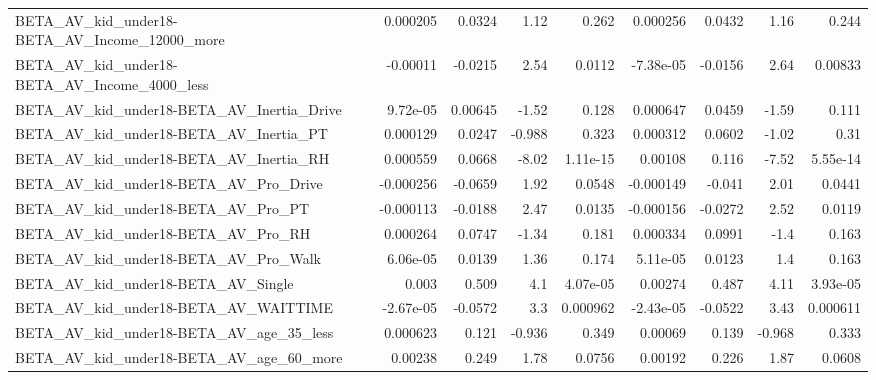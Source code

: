\begin{tabular}{lrrrrrrrr}
BETA\_AV\_kid\_under18-BETA\_AV\_Income\_12000\_more      &    0.000205 &       0.0324 &     1.12 &    0.262 &   0.000256 &      0.0432 &         1.16 &         0.244 \\
BETA\_AV\_kid\_under18-BETA\_AV\_Income\_4000\_less       &    -0.00011 &      -0.0215 &     2.54 &   0.0112 &  -7.38e-05 &     -0.0156 &         2.64 &       0.00833 \\
BETA\_AV\_kid\_under18-BETA\_AV\_Inertia\_Drive          &    9.72e-05 &      0.00645 &    -1.52 &    0.128 &   0.000647 &      0.0459 &        -1.59 &         0.111 \\
BETA\_AV\_kid\_under18-BETA\_AV\_Inertia\_PT             &    0.000129 &       0.0247 &   -0.988 &    0.323 &   0.000312 &      0.0602 &        -1.02 &          0.31 \\
BETA\_AV\_kid\_under18-BETA\_AV\_Inertia\_RH             &    0.000559 &       0.0668 &    -8.02 & 1.11e-15 &    0.00108 &       0.116 &        -7.52 &      5.55e-14 \\
BETA\_AV\_kid\_under18-BETA\_AV\_Pro\_Drive              &   -0.000256 &      -0.0659 &     1.92 &   0.0548 &  -0.000149 &      -0.041 &         2.01 &        0.0441 \\
BETA\_AV\_kid\_under18-BETA\_AV\_Pro\_PT                 &   -0.000113 &      -0.0188 &     2.47 &   0.0135 &  -0.000156 &     -0.0272 &         2.52 &        0.0119 \\
BETA\_AV\_kid\_under18-BETA\_AV\_Pro\_RH                 &    0.000264 &       0.0747 &    -1.34 &    0.181 &   0.000334 &      0.0991 &         -1.4 &         0.163 \\
BETA\_AV\_kid\_under18-BETA\_AV\_Pro\_Walk               &    6.06e-05 &       0.0139 &     1.36 &    0.174 &   5.11e-05 &      0.0123 &          1.4 &         0.163 \\
BETA\_AV\_kid\_under18-BETA\_AV\_Single                 &       0.003 &        0.509 &      4.1 & 4.07e-05 &    0.00274 &       0.487 &         4.11 &      3.93e-05 \\
BETA\_AV\_kid\_under18-BETA\_AV\_WAITTIME               &   -2.67e-05 &      -0.0572 &      3.3 & 0.000962 &  -2.43e-05 &     -0.0522 &         3.43 &      0.000611 \\
BETA\_AV\_kid\_under18-BETA\_AV\_age\_35\_less            &    0.000623 &        0.121 &   -0.936 &    0.349 &    0.00069 &       0.139 &       -0.968 &         0.333 \\
BETA\_AV\_kid\_under18-BETA\_AV\_age\_60\_more            &     0.00238 &        0.249 &     1.78 &   0.0756 &    0.00192 &       0.226 &         1.87 &        0.0608 \\

\end{tabular}
